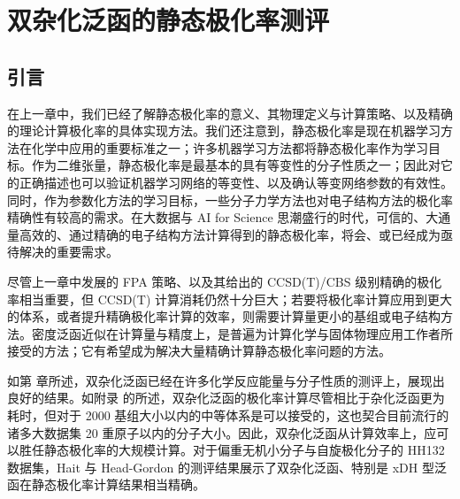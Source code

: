 
\chapter{双杂化泛函的静态极化率测评}
\label{sec.6.title}

\section{引言}

在上一章中，我们已经了解静态极化率的意义、其物理定义与计算策略、以及精确的理论计算极化率的具体实现方法。我们还注意到，静态极化率是现在机器学习方法在化学中应用的重要标准之一；许多机器学习方法都将静态极化率作为学习目标\cite{Ramakrishnan-Lilienfeld.SD.2014, Gilmer-Dahl.ICML.2017, Faber-Lilienfeld.JCTC.2017, Schuett-Mueller.NIPS.2017, Schuett-Mueller.JCP.2018, Wilkins-Ceriotti.PNAS.2019, Schuett-Gastegger.arXiv.2021, Zhang-Jiang.Elsevier.2023, Zou-Hu.NCS.2023}。作为二维张量，静态极化率是最基本的具有等变性的分子性质之一；因此对它的正确描述也可以验证机器学习网络的等变性、以及确认等变网络参数的有效性\cite{Cohen-Welling.arXiv.2016, Schuett-Gastegger.arXiv.2021, Brandstetter-Welling.arXiv.2022, Geiger-Smidt.arXiv.2022}。同时，作为参数化方法的学习目标，一些分子力学方法也对电子结构方法的极化率精确性有较高的需求\cite{Halgren-Damm.COSB.2001, Baker-Baker.WCMS.2015, Goloviznina-Padua.JCTC.2019, Schauperl-Gilson.CC.2020}。在大数据与 AI for Science 思潮盛行的时代，可信的、大通量高效的、通过精确的电子结构方法计算得到的静态极化率，将会、或已经成为亟待解决的重要需求。

尽管上一章中发展的 FPA 策略、以及其给出的 CCSD(T)/CBS 级别精确的极化率相当重要，但 CCSD(T) 计算消耗仍然十分巨大；若要将极化率计算应用到更大的体系，或者提升精确极化率计算的效率，则需要计算量更小的基组或电子结构方法。密度泛函近似在计算量与精度上，是普遍为计算化学与固体物理应用工作者所接受的方法；它有希望成为解决大量精确计算静态极化率问题的方法。

如第  章所述，双杂化泛函已经在许多化学反应能量与分子性质的测评上，展现出良好的结果。如附录  的所述，双杂化泛函的极化率计算尽管相比于杂化泛函更为耗时，但对于 2000 基组大小以内的中等体系是可以接受的，这也契合目前流行的诸多大数据集 20 重原子以内的分子大小\cite{Ruddigkeit-Reymond.JCIM.2012, Ramakrishnan-Lilienfeld.SD.2014, Bowman-Yu.JCP.2022, Zou-Hu.NCS.2023}。因此，双杂化泛函从计算效率上，应可以胜任静态极化率的大规模计算。对于偏重无机小分子与自旋极化分子的 HH132 数据集，Hait 与 Head-Gordon 的测评结果展示了双杂化泛函、特别是 xDH 型泛函在静态极化率计算结果相当精确\cite{Hait-Head-Gordon.PCCP.2018}。

